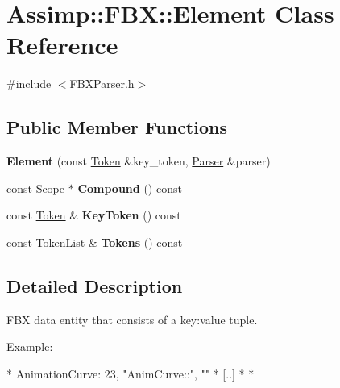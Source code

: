 \hypertarget{class_assimp_1_1_f_b_x_1_1_element}{\section{Assimp\+:\+:F\+B\+X\+:\+:Element Class Reference}
\label{class_assimp_1_1_f_b_x_1_1_element}
}


{\ttfamily \#include $<$F\+B\+X\+Parser.\+h$>$}

\subsection*{Public Member Functions}
\begin{DoxyCompactItemize}
\item 
\hypertarget{class_assimp_1_1_f_b_x_1_1_element_a0be7672f59bf29891cc4483b8be5eb9d}{{\bfseries Element} (const \hyperlink{class_assimp_1_1_f_b_x_1_1_token}{Token} \&key\+\_\+token, \hyperlink{class_assimp_1_1_f_b_x_1_1_parser}{Parser} \&parser)}\label{class_assimp_1_1_f_b_x_1_1_element_a0be7672f59bf29891cc4483b8be5eb9d}

\item 
\hypertarget{class_assimp_1_1_f_b_x_1_1_element_a4a3c1401383a9d751f7713ac89686945}{const \hyperlink{class_assimp_1_1_f_b_x_1_1_scope}{Scope} $\ast$ {\bfseries Compound} () const }\label{class_assimp_1_1_f_b_x_1_1_element_a4a3c1401383a9d751f7713ac89686945}

\item 
\hypertarget{class_assimp_1_1_f_b_x_1_1_element_a5b09c02aeb3ae737005a252c1c5f7eb8}{const \hyperlink{class_assimp_1_1_f_b_x_1_1_token}{Token} \& {\bfseries Key\+Token} () const }\label{class_assimp_1_1_f_b_x_1_1_element_a5b09c02aeb3ae737005a252c1c5f7eb8}

\item 
\hypertarget{class_assimp_1_1_f_b_x_1_1_element_a1cd47e56167f8cd1e49db9bfb5f6342a}{const Token\+List \& {\bfseries Tokens} () const }\label{class_assimp_1_1_f_b_x_1_1_element_a1cd47e56167f8cd1e49db9bfb5f6342a}

\end{DoxyCompactItemize}


\subsection{Detailed Description}
F\+B\+X data entity that consists of a key\+:value tuple.

Example\+: \begin{DoxyVerb}*    AnimationCurve: 23, "AnimCurve::", "" {
*        [..]
*    }
*  \end{DoxyVerb}


